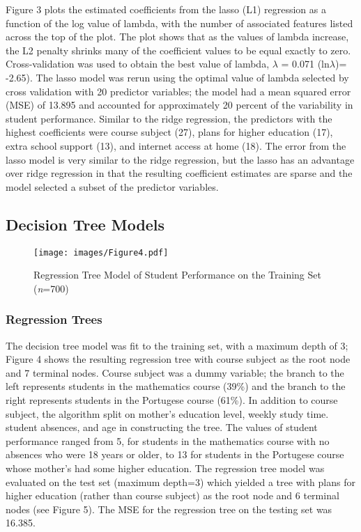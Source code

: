 \documentclass[sigconf]{acmart}
\begin{document}
Figure 3 plots the estimated coefficients from the lasso (L1) regression as 
a function of the log value of lambda, with the number of associated features 
listed across the top of the plot. The plot shows that as the values of lambda 
increase, the L2 penalty shrinks many of the coefficient values to be equal 
exactly to zero. Cross-validation was used to obtain the best value of lambda, 
$\lambda$ = 0.071 (ln$\lambda$)= -2.65). The lasso model was rerun using the 
optimal value of lambda selected by cross validation with 20 predictor 
variables; the model had a mean squared error (MSE) of 13.895 and accounted 
for approximately 20 percent of the variability in student performance. 
Similar to the ridge regression, the predictors with the highest coefficients 
were course subject (27), plans for higher education (17), extra school support 
(13), and internet access at home (18). The error from the lasso model is very 
similar to the ridge regression, but the lasso has an advantage over ridge 
regression in that the resulting coefficient estimates are sparse and the 
model selected a subset of the predictor variables. 



\subsection{Decision Tree Models}

\begin{figure}[!ht]
  \centering\texttt{[image: images/Figure4.pdf]}
  \caption{Regression Tree Model of Student Performance on the 
  Training Set (\textit{n}=700)}
  \label{f:Figure4}
\end{figure}


\subsubsection{Regression Trees}

The decision tree model was fit to the training set, with a maximum depth of 3;
Figure 4 shows the resulting regression tree with course subject as the root 
node and 7 terminal nodes. Course subject was a dummy variable; the branch to 
the left represents students in the mathematics course (39\%) and the branch to 
the right represents students in the Portugese course (61\%). In addition to 
course subject, the algorithm split on mother's education level, weekly study 
time. student absences, and age in constructing the tree. The values of student 
performance ranged from 5, for students in the mathematics course with no 
absences who were 18 years or older, to 13 for students in the Portugese course 
whose mother's had some higher education. The regression tree model was evaluated 
on the test set (maximum depth=3) which yielded a tree with plans for higher 
education (rather than course subject) as the root node and 6 terminal nodes 
(see Figure 5). The MSE for the regression tree on the testing set was 16.385.
\end{document}
